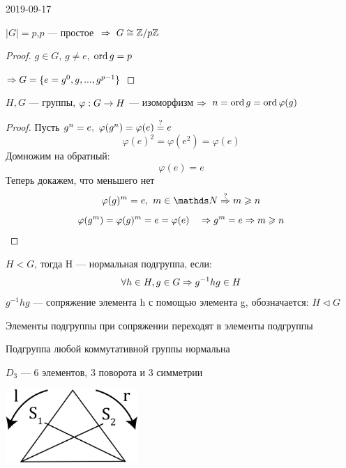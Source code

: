 \documentclass[main]{subfiles}
\begin{document}
\begin{lect} {2019-09-17}
	\begin{utv}
	    $|G|=p$,\q $p$ --- простое $\ \Rightarrow\  G \cong \mathbb{Z} /p \mathbb{Z}$
	\end{utv}

	\begin{proof}
	    $g \in G$, $g \neq e$, $\mathop{\rm ord}\nolimits g=p$

	    $\Rightarrow G=\{e=g^0,g,...,g^{p-1}\}$
	\end{proof}

	\begin{utv}
	    $H,G$ --- группы, $\varphi: G \rightarrow H$ --- изоморфизм $\Rightarrow$ $n=\mathop{\rm ord}\nolimits g=\mathop{\rm ord}\nolimits \varphi(g)$
	\end{utv}

	\begin{proof}
	    Пусть $g^n=e,\ \varphi(g^n)=\varphi(e)\os{?}{=}e$
	    \[\varphi(e)^2=\varphi(e^2)=\varphi(e)\]
		Домножим на обратный:
		\[\varphi(e) = e\]
	    Теперь докажем, что меньшего нет
	    \[\varphi(g)^m = e,\ m \in \N \os{?}{\Ra} m \geqslant n\]
		\[\varphi(g^m) = \varphi(g)^m = e = \varphi(e) \quad \Rightarrow g^m = e \Rightarrow m \geqslant n\]
	\end{proof}

	\begin{definition}
	    $H<G$, тогда H --- нормальная подгруппа, если:
		\[\forall h \in H, g \in G \Rightarrow g^{-1}h g \in H\]
		$g^{-1}h g$ --- сопряжение элемента h с помощью элемента g, обозначается: $H \triangleleft G$
	\end{definition}

	\begin{remark}
	    Элементы подгруппы при сопряжении переходят в элементы подгруппы
	\end{remark}

	\begin{remark}
	    Подгруппа любой коммутативной группы нормальна
	\end{remark}

	\begin{example}
	    $D_3$ --- 6 элементов, 3 поворота и 3 симметрии

	    \includegraphics[width = 5cm]{pics/triangle_d_3.png}


\end{example}
\end{lect}
\end{document}
